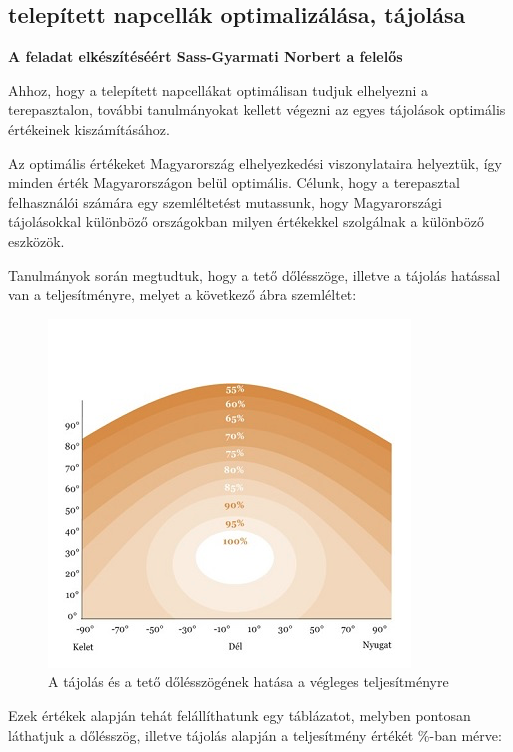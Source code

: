 \documentclass[
]{thesis-ekf}
\theoremstyle{definition}
\theoremstyle{remark}
\begin{document}
		\subsection{telepített napcellák optimalizálása, tájolása}
			 \textbf{A feladat elkészítéséért Sass-Gyarmati Norbert a felelős}
			 \par Ahhoz, hogy a telepített napcellákat optimálisan tudjuk elhelyezni a terepasztalon, további tanulmányokat kellett végezni az egyes tájolások optimális értékeinek kiszámításához. 
			 \par Az optimális értékeket Magyarország elhelyezkedési viszonylataira helyeztük, így minden érték Magyarországon belül optimális. Célunk, hogy a terepasztal felhasználói számára egy szemléltetést mutassunk, hogy Magyarországi tájolásokkal különböző országokban milyen értékekkel szolgálnak a különböző eszközök.
			 \par Tanulmányok során megtudtuk, hogy a tető dőlésszöge, illetve a tájolás hatással van a teljesítményre, melyet a következő ábra szemléltet:
			 \begin{figure}[H]
			 	\centering
			 	\includegraphics[scale=0.60]{./images/tajolas}
			 	\caption{A tájolás és a tető dőlésszögének hatása a végleges teljesítményre\cite{tajolas}}
			 \end{figure}
			 \par Ezek értékek alapján tehát felállíthatunk egy táblázatot, melyben pontosan láthatjuk a dőlésszög, illetve tájolás alapján a teljesítmény értékét \%-ban mérve:
\end{document}
